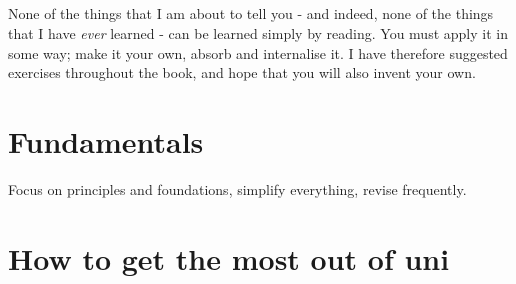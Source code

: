\documentclass[11pt]{memoir}
\begin{document}
	\paragraph{}
	None of the things that I am about to tell you - and indeed, none of the things that
	I have \emph{ever} learned - can be learned simply by reading. You must apply it in 
	some way; make it your own, absorb and internalise it. I have therefore suggested 
	exercises throughout the book, and hope that you will also invent your own. 
	
	\mainmatter
	
	
	
	
	
	\chapter{Fundamentals}
	Focus on principles and foundations, simplify everything, revise frequently.
	
	\chapter{How to get the most out of uni}
	
	
\end{document}
